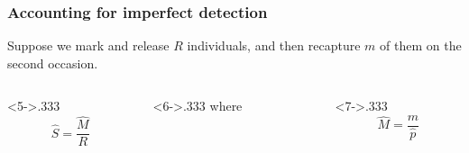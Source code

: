 \documentclass[color=usenames,dvipsnames]{beamer}\usepackage[]{graphicx}\usepackage[]{color}
\begin{document}
\begin{frame}
  \frametitle{Accounting for imperfect detection}
  Suppose we mark and { release} $R$ individuals, and then
    recapture $m$ of them on the second occasion. \par
    \vfill
    \vfill
    \vspace{-12pt}
    \vfill
  \begin{columns}
    \begin{column}<5->{.333\textheight}
      \[ %
      \hat{S} = \frac{\hat{M}}{R}
      \]
    \end{column}
    \begin{column}<6->{.333\textheight}
      \centering where \par
    \end{column}
    \begin{column}<7->{.333\textheight}
      \[ %
      \hat{M} = \frac{m}{\hat{p}}
      \]
    \end{column}
  \end{columns}
\end{frame}
\end{document}
